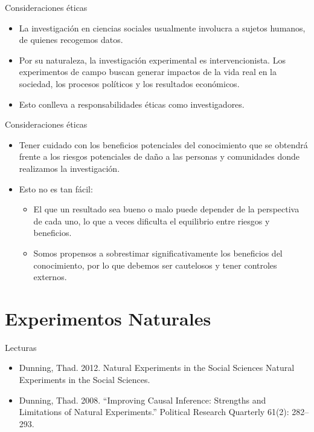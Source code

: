 \documentclass[
  ignorenonframetext,
]{beamer}
\providecommand{\tightlist}{%
  \setlength{\itemsep}{0pt}\setlength{\parskip}{0pt}}
\begin{document}
\begin{frame}{Consideraciones éticas}
\protect\hypertarget{consideraciones-uxe9ticas}{}
\begin{itemize}
\tightlist
\item
  La investigación en ciencias sociales usualmente involucra a sujetos
  humanos, de quienes recogemos datos.
\item
  Por su naturaleza, la investigación experimental es intervencionista.
  Los experimentos de campo buscan generar impactos de la vida real en
  la sociedad, los procesos políticos y los resultados económicos.
\item
  Esto conlleva a responsabilidades éticas como investigadores.
\end{itemize}
\end{frame}

\begin{frame}{Consideraciones éticas}
\protect\hypertarget{consideraciones-uxe9ticas-1}{}
\begin{itemize}
\tightlist
\item
  Tener cuidado con los beneficios potenciales del conocimiento que se
  obtendrá frente a los riesgos potenciales de daño a las personas y
  comunidades donde realizamos la investigación.
\item
  Esto no es tan fácil:

  \begin{itemize}
  \tightlist
  \item
    El que un resultado sea bueno o malo puede depender de la
    perspectiva de cada uno, lo que a veces dificulta el equilibrio
    entre riesgos y beneficios.
  \item
    Somos propensos a sobrestimar significativamente los beneficios del
    conocimiento, por lo que debemos ser cautelosos y tener controles
    externos.
  \end{itemize}
\end{itemize}
\end{frame}

\hypertarget{experimentos-naturales}{%
\section{Experimentos Naturales}\label{experimentos-naturales}}

\begin{frame}{Lecturas}
\protect\hypertarget{lecturas-1}{}
\begin{itemize}
\item
  Dunning, Thad. 2012. Natural Experiments in the Social Sciences
  Natural Experiments in the Social Sciences.
\item
  Dunning, Thad. 2008. ``Improving Causal Inference: Strengths and
  Limitations of Natural Experiments.'' Political Research Quarterly
  61(2): 282--293.
\end{itemize}
\end{frame}
\end{document}
